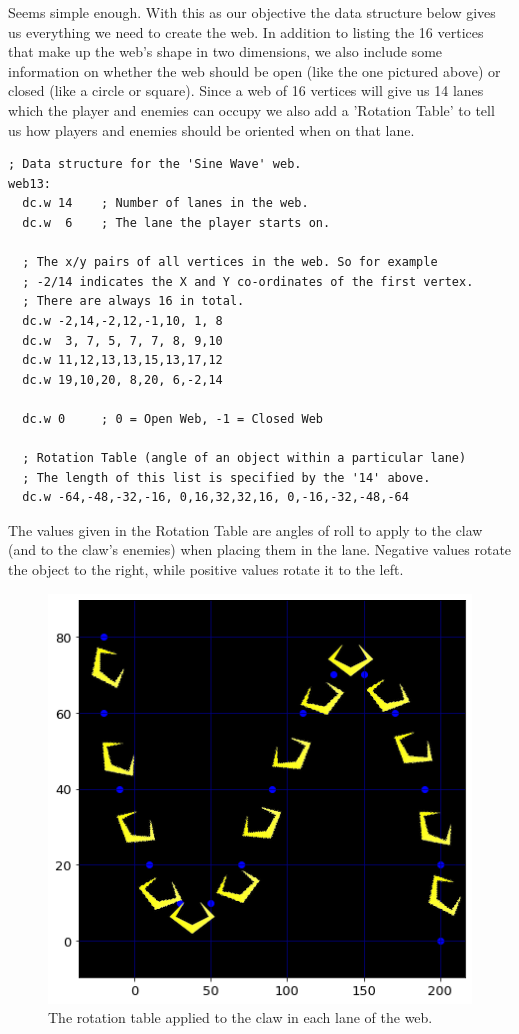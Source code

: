 Seems simple enough. With this as our objective the data structure below gives us
everything we need to create the web. In addition to listing the 16 vertices that
make up the web's shape in two dimensions, we also include some information on whether
the web should be open (like the one pictured above) or closed (like a circle or 
square). Since a web of 16 vertices will give us 14 lanes which the player and
enemies can occupy we also add a 'Rotation Table' to tell us how players and
enemies should be oriented when on that lane.

\begin{lstlisting}
; Data structure for the 'Sine Wave' web. 
web13:       
  dc.w 14    ; Number of lanes in the web.
  dc.w  6    ; The lane the player starts on.

  ; The x/y pairs of all vertices in the web. So for example
  ; -2/14 indicates the X and Y co-ordinates of the first vertex.
  ; There are always 16 in total.
  dc.w -2,14,-2,12,-1,10, 1, 8
  dc.w  3, 7, 5, 7, 7, 8, 9,10
  dc.w 11,12,13,13,15,13,17,12
  dc.w 19,10,20, 8,20, 6,-2,14

  dc.w 0     ; 0 = Open Web, -1 = Closed Web
    
  ; Rotation Table (angle of an object within a particular lane)
  ; The length of this list is specified by the '14' above.
  dc.w -64,-48,-32,-16, 0,16,32,32,16, 0,-16,-32,-48,-64
\end{lstlisting}

The values given in the Rotation Table are angles of roll to apply to the claw
(and to the claw's enemies) when placing them in the lane. Negative values rotate
the object to the right, while positive values rotate it to the left. 
\begin{figure}[H]
    \centering
    \begin{adjustbox}{width=6cm,center}
      \includegraphics[width=12cm]{src/webs/sine_wave_dots_claws_no_title.png}%
    \end{adjustbox}
  \caption{The rotation table applied to the claw in each lane of the web.}
\end{figure}

